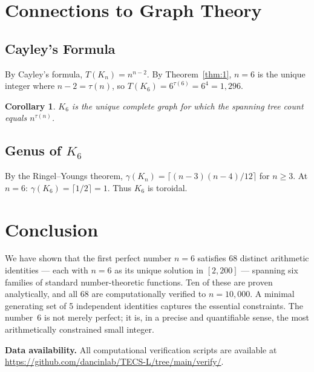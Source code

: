 \documentclass{article}
\newtheorem{corollary}[theorem]{Corollary}
\begin{document}
\section{Connections to Graph Theory}

\subsection{Cayley's Formula}

By Cayley's formula, $T(K_n) = n^{n-2}$. By Theorem~\ref{thm:1}, $n = 6$ is the unique integer where $n - 2 = \tau(n)$, so $T(K_6) = 6^{\tau(6)} = 6^4 = 1{,}296$.

\begin{corollary}
$K_6$ is the unique complete graph for which the spanning tree count equals $n^{\tau(n)}$.
\end{corollary}

\subsection{Genus of $K_6$}

By the Ringel--Youngs theorem, $\gamma(K_n) = \lceil (n-3)(n-4)/12 \rceil$ for $n \geq 3$. At $n = 6$: $\gamma(K_6) = \lceil 1/2 \rceil = 1$. Thus $K_6$ is toroidal.

\section{Conclusion}

We have shown that the first perfect number $n = 6$ satisfies 68 distinct arithmetic identities --- each with $n = 6$ as its unique solution in $[2, 200]$ --- spanning six families of standard number-theoretic functions. Ten of these are proven analytically, and all 68 are computationally verified to $n = 10{,}000$. A minimal generating set of 5 independent identities captures the essential constraints. The number~6 is not merely perfect; it is, in a precise and quantifiable sense, the most arithmetically constrained small integer.

\bigskip
\noindent\textbf{Data availability.} All computational verification scripts are available at \url{https://github.com/dancinlab/TECS-L/tree/main/verify/}.
\end{document}
